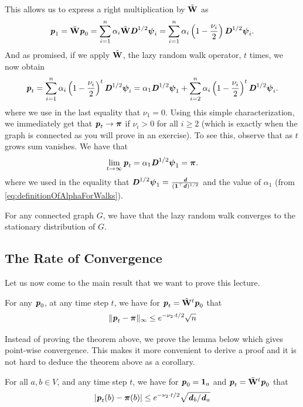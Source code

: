 This allows us to express a right multiplication by ${\tilde{\mathbf{W}}}$ as
\[
    \boldsymbol{\mathit{p}}_1 = {\tilde{\mathbf{W}}} \boldsymbol{\mathit{p}}_0 = \sum_{i=1}^n \alpha_i {\tilde{\mathbf{W}}} \boldsymbol{\mathit{D}}^{1/2} \boldsymbol{\mathit{\psi}}_i = \sum_{i=1}^n \alpha_i \left(1-\frac{\nu_i}{2}\right) \boldsymbol{\mathit{D}}^{1/2} \boldsymbol{\mathit{\psi}}_i.
\]
And as promised, if we apply ${\tilde{\mathbf{W}}}$, the lazy random walk operator, $t$ times, we now obtain
\begin{align}\label{eq:distributionRandomWalkTSteps}
    \boldsymbol{\mathit{p}}_t = \sum_{i=1}^n \alpha_i \left(1-\frac{\nu_i}{2}\right)^t \boldsymbol{\mathit{D}}^{1/2} \boldsymbol{\mathit{\psi}}_i = \alpha_1 \boldsymbol{\mathit{D}}^{1/2} \boldsymbol{\mathit{\psi}}_1 + \sum_{i=2}^n \alpha_i \left(1-\frac{\nu_i}{2}\right)^t \boldsymbol{\mathit{D}}^{1/2} \boldsymbol{\mathit{\psi}}_i.
\end{align}
where we use in the last equality that $\nu_1 = 0$. Using this simple characterization, we immediately get that $\boldsymbol{\mathit{p}}_t \to \boldsymbol{\pi}$ if $\nu_i > 0$ for all $i \geq 2$ (which is exactly when the graph is connected as you will prove in an exercise). To see this, observe that as $t$ grows sum vanishes. We have that
\[
    \lim_{t \to \infty} \boldsymbol{\mathit{p}}_t = \alpha_1 \boldsymbol{\mathit{D}}^{1/2} \boldsymbol{\mathit{\psi}}_1 = \boldsymbol{\pi}.
\]
where we used in the equality that $\boldsymbol{\mathit{D}}^{1/2} \boldsymbol{\mathit{\psi}}_1 = \frac{\boldsymbol{\mathit{d}} }{(\boldsymbol{1}^{\top} \boldsymbol{\mathit{d}})^{1/2}}$ and the value of $\alpha_1$ (from \ref{eq:definitionOfAlphaForWalks}).

\begin{theorem}
For any connected graph $G$, we have that the lazy random walk converges to the stationary distribution of $G$.
\end{theorem}

\subsection{The Rate of Convergence}

Let us now come to the main result that we want to prove this lecture. 

\begin{theorem}
For any $\boldsymbol{\mathit{p}}_0$, at any time step $t$, we have for $\boldsymbol{\mathit{p}}_t = {\tilde{\mathbf{W}}}^t \boldsymbol{\mathit{p}}_0$ that
\[
\| \boldsymbol{\mathit{p}}_t - \boldsymbol{\pi} \|_{\infty}  \leq e^{-\nu_2 \cdot t/2} \sqrt{n} 
\]
\end{theorem}

Instead of proving the theorem above, we prove the lemma below which gives point-wise convergence. This makes it more convenient to derive a proof and it is not hard to deduce the theorem above as a corollary.

\begin{lemma}
For all $a,b \in V$, and any time step $t$, we have for $\boldsymbol{\mathit{p}}_0 = \boldsymbol{1}_a$ and $\boldsymbol{\mathit{p}}_t = {\tilde{\mathbf{W}}}^t \boldsymbol{\mathit{p}}_0$ that
\[
  |\boldsymbol{\mathit{p}}_t(b) - \boldsymbol{\pi}(b)| \leq e^{-\nu_2 \cdot t/2} \sqrt{\boldsymbol{\mathit{d}}_b/\boldsymbol{\mathit{d}}_a} 
\]
\end{lemma}

